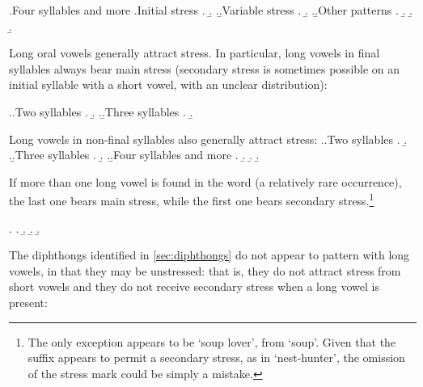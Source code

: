\ex.\label{bothoa-llll}Four syllables and more
\a.Initial stress
\a.
\b.
\z.\b.Variable stress
\a.\label{pochennadou}
\b.\mbi{[pɔʃəˈnadəw]}
\z.\b.Other patterns
\a.
\b.
\b.
\b.


Long oral vowels generally attract stress. In particular, long vowels in final syllables always bear main stress (secondary stress is sometimes possible on an initial syllable with a short vowel, with an unclear distribution):

\ex.\label{bothoa-final-h}\a.Two syllables
\a.
\b.
\z.\b.Three syllables
\a.\label{kemener}
\b.


Long vowels in non-final syllables also generally attract stress:
\ex.\a.Two syllables
\a.
\b.
\z.\b.Three syllables
\a.
\b.
\z.\b.Four syllables and more
\a.
\b.
\b.
\b.


If more than one long vowel is found in the word (a relatively rare occurrence), the last one bears main stress, while the first one bears secondary stress.\footnote{The only exception appears to be \ipa{[zuːbəˈnɛːr]} `soup lover', from \ipa{[ˈzuːbən]} `soup'. Given that the  suffix appears to  permit a secondary stress, as in \ipa{[ˌniːʒəˈtɛːr]} `nest-hunter', the omission of the stress mark could be simply a mistake.}

\ex.\label{bothoa-hh}
\a.
\b.
\b.
\b.


The diphthongs identified in \cref{sec:diphthongs} do not appear to pattern with long vowels, in that they may be unstressed: that is, they do not attract stress from short vowels and they do not receive secondary stress when a long vowel is present:


